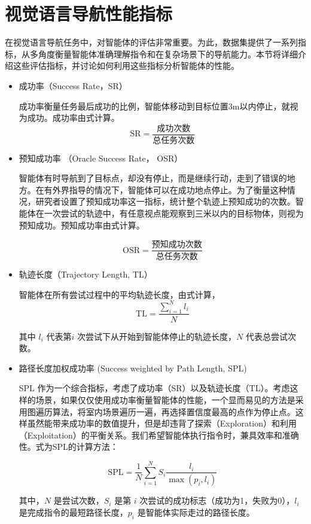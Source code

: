 \documentclass[bachelor]{thesis-uestc}
\begin{document}
\section{视觉语言导航性能指标}

在视觉语言导航任务中，对智能体的评估非常重要。为此，数据集提供了一系列指标，从多角度衡量智能体准确理解指令和在复杂场景下的导航能力。本节将详细介绍这些评估指标，并讨论如何利用这些指标分析智能体的性能。

\begin{itemize}
    \item 成功率（Success Rate，SR）
    
    成功率衡量任务最后成功的比例，智能体移动到目标位置3m以内停止，就视为成功。成功率由式计算。
    \begin{equation}
        \text{SR} = \frac{\text{成功次数}}{\text{总任务次数}}
    \label{sr}
    \end{equation}
    \item 预知成功率 （Oracle Success Rate， OSR）
    
    智能体有时导航到了目标点，却没有停止，而是继续行动，走到了错误的地方。在有外界指导的情况下，智能体可以在成功地点停止。为了衡量这种情况，研究者设置了预知成功率这一指标，统计整个轨迹上预知成功的次数。智能体在一次尝试的轨迹中，有任意视点能观察到三米以内的目标物体，则视为预知成功。预知成功率由式计算。

    \begin{equation}
        \text{OSR} = \frac{\text{预知成功次数}}{\text{总任务次数}}
    \label{OSR}
    \end{equation}


    \item 轨迹长度（Trajectory Length, TL）
    
    智能体在所有尝试过程中的平均轨迹长度，由式计算，
    \begin{equation}
        \text{TL} = \frac{\sum_{i=1}^N l_i}{N}
    \label{tl}
    \end{equation}

    其中 $l_i$ 代表第$i$ 次尝试下从开始到智能体停止的轨迹长度，$N$ 代表总尝试次数。

    \item 路径长度加权成功率 (Success weighted by Path Length, SPL)
    
    SPL 作为一个综合指标，考虑了成功率（SR）以及轨迹长度（TL）。考虑这样的场景，如果仅仅使用成功率衡量智能体的性能，一个显而易见的方法是采用图遍历算法，将室内场景遍历一遍，再选择置信度最高的点作为停止点。这样虽然能带来成功率的数值提升，但是却违背了探索（Exploration）和利用（Exploitation）的平衡关系。我们希望智能体执行指令时，兼具效率和准确性。式为SPL的计算方法：

    \begin{equation}
        \text{SPL} = \frac{1}{N} \sum_{i=1}^{N} S_i \frac{l_i}{\max(p_i, l_i)}
    \label{spl}
    \end{equation}

    其中，\( N \) 是尝试次数，\( S_i \) 是第 \( i \) 次尝试的成功标志（成功为1，失败为0），\( l_i \) 是完成指令的最短路径长度，\( p_i \) 是智能体实际走过的路径长度。
\end{itemize}
\end{document}
